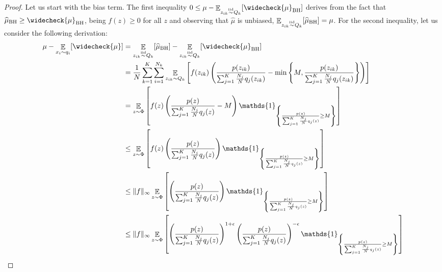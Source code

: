 \documentclass{article}
\begin{document}
\truncatedbias*
\begin{proof}
Let us start with the bias term. The first inequality $0 \le \mu - \Exp_{z_{ik} \simiid Q_k} [\widecheck{\mu}_{\text{BH}}]$ derives from the fact that $\widehat{\mu}_{\text{BH}} \ge \widecheck{\mu}_{\text{BH}}$, being $f(z) \ge 0$ for all $z$ and observing that $\widehat{\mu}$ is unbiased, \ie $\mathop{\mathbb{E}}_{z_{ik} \stackrel{\text{iid}}{\sim} Q_k}[\widehat{\mu}_{\text{BH}}]=\mu$. For the second inequality, let us consider the following derivation:
    \begin{align}
    \mu - \Exp_{x_i \sim q_i} [\widecheck{\mu}]&  = \Exp_{z_{ik} \simiid Q_k}[\widehat{\mu}_{\text{BH}}] - \Exp_{z_{ik} \simiid Q_k} [\widecheck{\mu}_{\text{BH}}] \notag \\
    & =  \frac{1}{N} \sum_{k=1}^K\sum_{i=1}^{N_k} \Exp_{z_{ik} \sim Q_k} \left[  f(z_{ik}) \left( \frac{p(z_{ik})}{\sum_{j=1}^K \frac{N_j}{N} q_j(z_{ik})} - \min \left\{ M,  \frac{p(z_{ik})}{\sum_{j=1}^K \frac{N_j}{N} q_j(z_{ik})} \right\} \right) \right]\\    
    & =  \Exp_{z \sim \Phi} \left[  f(z) \left(  \frac{p(z)}{\sum_{j=1}^K \frac{N_j}{N} q_j(z)} - M  \right) \mathds{1}_{\left\{ \frac{p(z)}{\sum_{j=1}^K \frac{N_j}{N} q_j(z)} \ge M \right\} } \right] \label{p:truncatedbias1}\\
    & \le \Exp_{z \sim \Phi} \left[  f(z) \left(  \frac{p(z)}{\sum_{j=1}^K \frac{N_j}{N} q_j(z)} \right) \mathds{1}_{\left\{ \frac{p(z)}{\sum_{j=1}^K \frac{N_j}{N} q_j(z)} \ge M \right\} } \right] \label{p:truncatedbias2}\\
    & \le \|f\|_{\infty} \Exp_{z \sim \Phi} \left[  \left(  \frac{p(z)}{\sum_{j=1}^K \frac{N_j}{N} q_j(z)} \right) \mathds{1}_{\left\{ \frac{p(z)}{\sum_{j=1}^K \frac{N_j}{N} q_j(z)} \ge M \right\} } \right] \notag\\
    & \le \|f\|_{\infty} \Exp_{z \sim \Phi} \left[  \left(  \frac{p(z)}{\sum_{j=1}^K \frac{N_j}{N} q_j(z)} \right)^{1+\epsilon} \left(  \frac{p(z)}{\sum_{j=1}^K \frac{N_j}{N} q_j(z)} \right)^{-\epsilon} \mathds{1}_{\left\{ \frac{p(z)}{\sum_{j=1}^K \frac{N_j}{N} q_j(z)} \ge M \right\} } \right] \notag\\

\end{align}
\end{proof}
\end{document}
